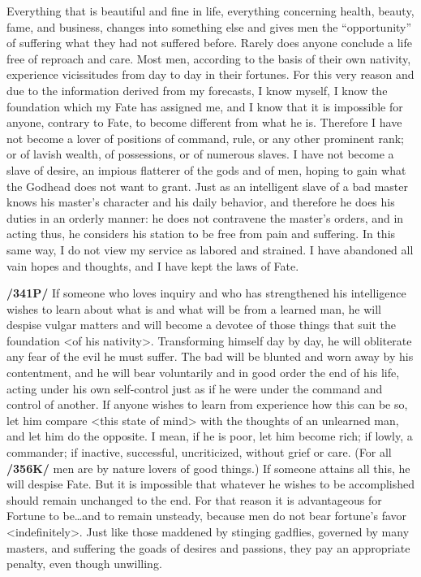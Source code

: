 Everything that is beautiful and fine in life, everything concerning health, beauty, fame, and business, changes into something else and gives men the “opportunity” of suffering what they had not suffered before. Rarely does anyone conclude a life free of reproach and care. Most men, according to the basis of their own nativity, experience vicissitudes from day to day in their fortunes. For this very reason and due to the information derived from my forecasts, I know myself, I know the foundation which my Fate has assigned me, and I know that it is impossible for anyone, contrary to Fate, to become different from what he is. Therefore I have not become a lover of positions of command, rule, or any other prominent rank; or of lavish wealth, of possessions, or of numerous slaves. I have not become a slave of desire, an impious flatterer of the gods and of men, hoping to gain what the Godhead does not want to grant. Just as an intelligent slave of a bad master knows his master’s character and his daily behavior,
and therefore he does his duties in an orderly manner: he does not contravene the master’s orders, and in acting thus, he considers his station to be free from pain and suffering. In this same way, I do not view my service as labored and strained. I have abandoned all vain hopes and thoughts, and I have kept the laws of Fate.

\textbf{/341P/} If someone who loves inquiry and who has strengthened his intelligence wishes to learn about what is and what will be from a learned man, he will despise vulgar matters and will become a devotee of those things that suit the foundation <of his nativity>. Transforming himself day by day, he will obliterate any fear of the evil he must suffer. The bad will be blunted and worn away by his contentment, and he will bear voluntarily and in good order the end of his life, acting under his own self-control just as if he were under the command and control of another. If anyone wishes to learn from experience how this can be so, let him compare <this state of mind> with the thoughts of an unlearned man, and let him do the opposite.
I mean, if he is poor, let him become rich; if lowly, a commander; if inactive, successful, uncriticized, without grief or care. (For all \textbf{/356K/} men are by nature lovers of good things.) If someone attains all this, he will despise Fate. But it is impossible that whatever he wishes to be accomplished should remain unchanged to the end. For that reason it is advantageous for Fortune to be…and to remain unsteady,
because men do not bear fortune’s favor <indefinitely>. Just like those maddened by stinging gadflies, governed by many masters, and suffering the goads of desires and passions, they pay an appropriate penalty, even though unwilling.

